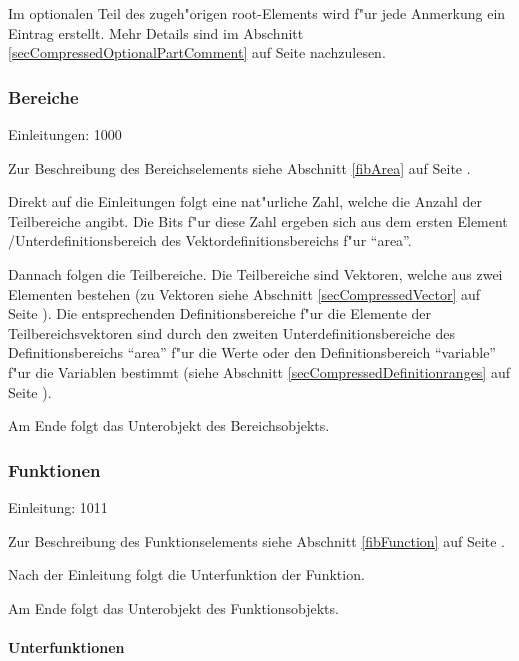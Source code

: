 Im optionalen Teil des zugeh"origen root-Elements wird f"ur jede Anmerkung ein Eintrag erstellt. Mehr Details sind im Abschnitt \ref{secCompressedOptionalPartComment} auf Seite \pageref{secCompressedOptionalPartComment} nachzulesen.



\subsubsection{Bereiche}
\label{secCompressedArea}

Einleitungen: 1000

\bigskip\noindent
Zur Beschreibung des Bereichselements siehe Abschnitt \ref{fibArea} auf Seite \pageref{fibArea} .

Direkt auf die Einleitungen folgt eine nat"urliche Zahl, welche die Anzahl der Teilbereiche angibt. Die Bits f"ur diese Zahl ergeben sich aus dem ersten Element /Unterdefinitionsbereich des Vektordefinitionsbereichs f"ur ``area''.

Dannach folgen die Teilbereiche.
Die Teilbereiche sind Vektoren, welche aus zwei Elementen bestehen (zu Vektoren siehe Abschnitt \ref{secCompressedVector} auf Seite \pageref{secCompressedVector}).
Die entsprechenden Definitionsbereiche f"ur die Elemente der Teilbereichsvektoren sind durch den zweiten Unterdefinitionsbereiche des Definitionsbereichs ``area'' f"ur die Werte oder den Definitionsbereich ``variable'' f"ur die Variablen bestimmt (siehe Abschnitt \ref{secCompressedDefinitionranges} auf Seite \pageref{secCompressedDefinitionranges}).

Am Ende folgt das Unterobjekt des Bereichsobjekts.



\subsubsection{Funktionen}
\label{secCompressedFunctions}

Einleitung: 1011

\bigskip\noindent
Zur Beschreibung des Funktionselements siehe Abschnitt \ref{fibFunction} auf Seite \pageref{fibFunction} .

Nach der Einleitung folgt die Unterfunktion der Funktion.

Am Ende folgt das Unterobjekt des Funktionsobjekts.


\paragraph{Unterfunktionen}
\label{secCompressedUnderFunction}

